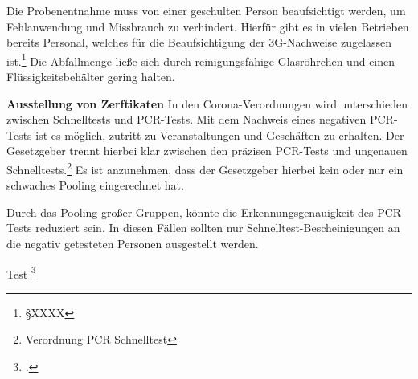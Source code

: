 Die Probenentnahme muss von einer geschulten Person beaufsichtigt werden, um Fehlanwendung und Missbrauch zu verhindert.
Hierfür gibt es in vielen Betrieben bereits Personal, welches für die Beaufsichtigung der 3G-Nachweise zugelassen ist.\footnote{§XXXX}
Die Abfallmenge ließe sich durch reinigungsfähige Glasröhrchen und einen Flüssigkeitsbehälter gering halten.

\textbf{Ausstellung von Zerftikaten}\newline
In den Corona-Verordnungen wird unterschieden zwischen Schnelltests und PCR-Tests.
Mit dem Nachweis eines negativen PCR-Tests ist es möglich, zutritt zu Veranstaltungen und Geschäften zu erhalten.
Der Gesetzgeber trennt hierbei klar zwischen den präzisen PCR-Tests und ungenauen Schnelltests.\footnote{Verordnung PCR Schnelltest}
Es ist anzunehmen, dass der Gesetzgeber hierbei kein oder nur ein schwaches Pooling eingerechnet hat.

Durch das Pooling großer Gruppen, könnte die Erkennungsgenauigkeit des PCR-Tests reduziert sein.
In diesen Fällen sollten nur Schnelltest-Bescheinigungen an die negativ getesteten Personen ausgestellt werden.

Test
\footcite{TD15}
\cleardoublepage